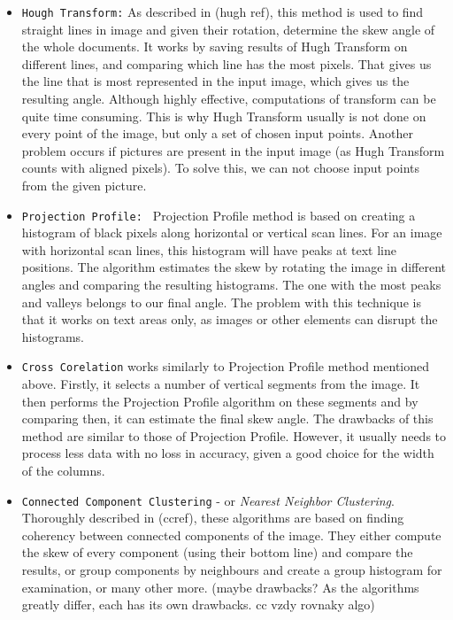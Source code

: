 \begin{itemize}

\item\texttt{Hough Transform:} As described in (hugh ref), this method is used to find straight lines in image and given their rotation, determine the skew angle of the whole documents. It works by saving results of Hugh Transform on different lines, and comparing which line has the most pixels. That gives us the line that is most represented in the input image, which gives us the resulting angle. Although highly effective, computations of transform can be quite time consuming. This is why Hugh Transform usually is not done on every point of the image, but only a set of chosen input points. Another problem occurs if pictures are present in the input image (as Hugh Transform counts with aligned pixels). To solve this, we can not choose input points from the given picture.

\item\texttt{Projection Profile: } Projection Profile method is based on creating a histogram of black pixels along horizontal or vertical scan lines. For an image with horizontal scan lines, this histogram will have peaks at text line positions. The algorithm estimates the skew by rotating the image in different angles and comparing the resulting histograms. The one with the most peaks and valleys belongs to our final angle. The problem with this technique is that it works on text areas only, as images or other elements can disrupt the histograms.

\item\texttt{Cross Corelation} works similarly to Projection Profile method mentioned above. Firstly, it selects a number of vertical segments from the image. It then performs the Projection Profile algorithm on these segments and by comparing then, it can estimate the final skew angle.
The drawbacks of this method are similar to those of Projection Profile. However, it usually needs to process less data with no loss in accuracy, given a good choice for the width of the columns.

\item\texttt{Connected Component Clustering} - or  \emph{Nearest Neighbor Clustering}. Thoroughly described in (ccref), these algorithms are based on finding coherency between connected components of the image. They either compute the skew of every component (using their bottom line) and compare the results, or group components by neighbours and create a group histogram for examination, or many other more. (maybe drawbacks? As the algorithms greatly differ, each has its own drawbacks. cc vzdy rovnaky algo)

\end{itemize}

